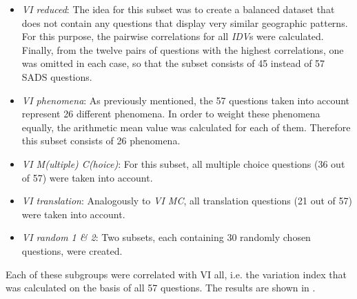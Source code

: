 \documentclass[output=paper]{LSP/langsci}
\begin{document}
\begin{itemize}
\item \emph{VI reduced}: The idea for this subset was to create a balanced dataset that does not contain any questions that display very similar geographic patterns. For this purpose, the pairwise correlations for all \emph{IDV}s were calculated. Finally, from the twelve pairs of questions with the highest correlations, one was omitted in each case, so that the subset consists of 45 instead of 57 SADS questions.
\item \emph{VI phenomena}: As previously mentioned, the 57 questions taken into account represent 26 different phenomena. In order to weight these phenomena equally, the arithmetic mean value was calculated for each of them. Therefore this subset consists of 26 phenomena.
\item \emph{VI M(ultiple) C(hoice)}: For this subset, all multiple choice questions (36 out of 57) were taken into account.
\item \emph{VI translation}: Analogously to \emph{VI MC}, all translation questions (21 out of 57) were taken into account.
\item \emph{VI random 1 \& 2}: Two subsets, each containing 30 randomly chosen questions, were created.
\end{itemize}

Each of these subgroups were correlated with VI all, i.e. the variation index that was calculated on the basis of all 57 questions. The results are shown in .
\end{document}
